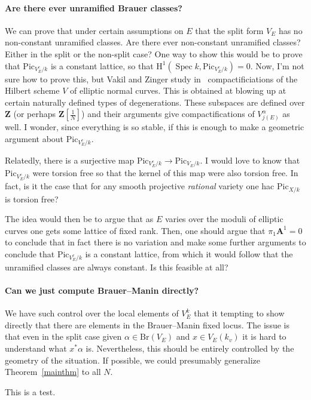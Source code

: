 \documentclass[10pt,letterpaper,twoside]{article}
\renewcommand{\H}{\mathrm{H}}
\renewcommand{\1}{\mathbf{1}}
\newcommand{\bA}{\mathbf{A}}
\newcommand{\bZ}{\mathbf{Z}}
\newcommand{\Pic}{\mathrm{Pic}}
\newcommand{\Br}{\mathrm{Br}}
\DeclareMathOperator{\Spec}{Spec}
\theoremstyle{plain}
\theoremstyle{plain}
\theoremstyle{definition}
\theoremstyle{named}
\theoremstyle{definition}
\begin{document}
	\paragraph{Are there ever unramified Brauer classes?} We can prove that under certain assumptions on
	$E$ that the split form $V_E$ has no non-constant unramified classes. Are there ever non-constant
	unramified classes? Either in the split or the non-split case? One way to show this would be to
	prove that $\Pic_{V^c_E/k}$ is a constant lattice, so that $\H^1(\Spec k,\Pic_{V^c_E/k})=0$. Now,
	I'm not sure how to prove this, but Vakil and Zinger study
	in~\cite{vakil-zinger,vakil-zinger-announce} compactificiations of the Hilbert scheme $V$ of elliptic normal
	curves. This is obtained at blowing up at certain naturally defined types of degenerations. These
	subspaces are defined over $\bZ$ (or perhaps $\bZ[\tfrac{1}{N}]$) and their arguments give
	compactifications of $V_{j(E)}^\alpha$ as well. I wonder, since everything is so stable, if this is
	enough to make a geometric argument about $\Pic_{V^c_E/k}$.
	
	Relatedly, there is a surjective map $\Pic_{V^c_E/k}\rightarrow\Pic_{V_E/k}$. I would love to know
	that $\Pic_{V^c_E/k}$ were torsion free so that the kernel of this map were also torsion free. In
	fact, is it the case that for any smooth projective {\em rational} variety one hac $\Pic_{X/k}$ is
	torsion free?
	
	The idea would then be to argue that as $E$ varies over the moduli of elliptic curves one gets some
	lattice of fixed rank. Then, one should argue that $\pi_1\bA^1=0$ to conclude that in fact there is
	no variation and make some further arguments to conclude that $\Pic_{V^c_E/k}$ is a constant
	lattice, from which it would follow that the unramified classes are always constant. Is this
	feasible at all?
	
	\paragraph{Can we just compute Brauer--Manin directly?} We have such control over the local elements
	of $V_E^k$ that it tempting to show directly that there are elements in the Brauer--Manin fixed
	locus. The issue is that even in the split case given $\alpha\in\Br(V_E)$ and $x\in V_E(k_v)$ it is
	hard to understand what $x^*\alpha$ is.
	Nevertheless, this should be entirely controlled by the geometry of the situation. If possible, we
	could presumably generalize Theorem~\ref{mainthm} to all $N$.
	
	This is a test.
	
	
	\small
	
	
	
\end{document}
